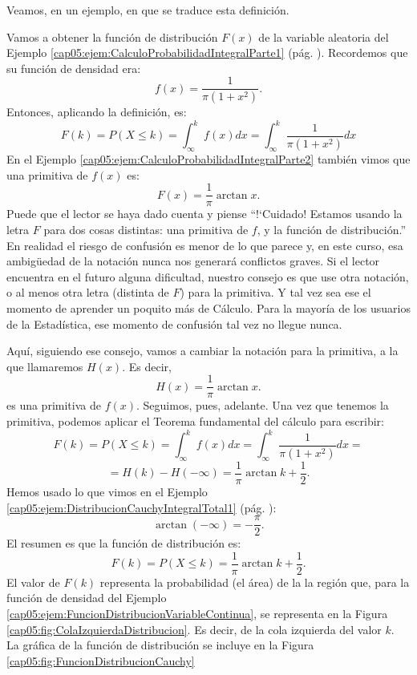 Veamos, en un ejemplo, en que se traduce esta definición.

\begin{ejemplo}
\label{cap05:ejem:FuncionDistribucionVariableContinua}
Vamos a obtener la función de distribución $F(x)$ de la variable aleatoria del Ejemplo \ref{cap05:ejem:CalculoProbabilidadIntegralParte1} (pág. \pageref{cap05:ejem:CalculoProbabilidadIntegralParte1}). Recordemos que su función de densidad era:
    \[f(x)=\dfrac{1}{\pi(1+x^2)}.\]
Entonces, aplicando la definición, es:
    \[F(k)=P(X\leq k)=\int_{\infty}^{k} f(x)dx = \int_{\infty}^{k} \dfrac{1}{\pi(1+x^2)} dx \]
En el Ejemplo \ref{cap05:ejem:CalculoProbabilidadIntegralParte2} también vimos que una primitiva de $f(x)$ es:
\[F(x)= \dfrac{1}{\pi}\arctan x.\]
Puede que el lector se haya dado cuenta y piense ``{!`}Cuidado! Estamos usando la letra $F$ para dos cosas distintas: una primitiva de $f$, y la función de distribución.'' En realidad el riesgo de confusión es menor de lo que parece y, en este curso, esa ambigüedad de la notación nunca nos generará conflictos graves. Si el lector encuentra en el futuro alguna dificultad, nuestro consejo es que use otra notación, o al menos otra letra (distinta de $F$) para la primitiva. Y tal vez sea ese el momento de aprender un poquito más de Cálculo. Para la mayoría de los usuarios de la Estadística, ese momento de confusión tal vez no llegue nunca.

Aquí, siguiendo ese consejo, vamos a cambiar la notación para la primitiva, a la que llamaremos $H(x)$. Es decir,
\[H(x)= \dfrac{1}{\pi}\arctan x.\]
es una primitiva de $f(x)$.  Seguimos, pues, adelante. Una vez que tenemos la primitiva, podemos aplicar el Teorema fundamental del cálculo para escribir:
\[F(k)=P(X\leq k)=\int_{\infty}^{k} f(x)dx = \int_{\infty}^{k} \dfrac{1}{\pi(1+x^2)} dx =\]
\[= H(k) - H(-\infty)= \dfrac{1}{\pi}\arctan k +\dfrac{1}{2}.\]
Hemos usado lo que vimos en el Ejemplo \ref{cap05:ejem:DistribucionCauchyIntegralTotal1} (pág. \pageref{cap05:ejem:DistribucionCauchyIntegralTotal1}):
\[\arctan(-\infty)=-\dfrac{\pi}{2}.\]
El resumen es que la función de distribución es:
\[F(k)=P(X\leq k)=\dfrac{1}{\pi}\arctan k +\dfrac{1}{2}.\]
El valor de $F(k)$ representa la probabilidad (el área) de la la región que, para la función de densidad del Ejemplo \ref{cap05:ejem:FuncionDistribucionVariableContinua}, se representa en la Figura \ref{cap05:fig:ColaIzquierdaDistribucion}. Es decir, de la cola izquierda del valor $k$. La gráfica de la función de distribución se incluye en la Figura \ref{cap05:fig:FuncionDistribucionCauchy}


\end{ejemplo}
